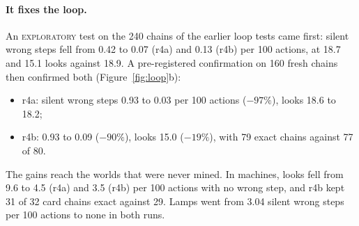 \documentclass[11pt]{article}
\newcommand{\explo}{\textsc{exploratory}}
\begin{document}
\begin{table}[t]\centering\small
\caption{Training on its own errors. Single questions: the trainer's readout on the 15,008 items (accuracy; confident
errors per 100 answers in T / H / U; Appendix~\ref{app:overlap} gives them without the questions that overlap the
training rows). Loop: the default rule on chains paired with V42, silent wrong steps
and looks per 100 actions. Guard: the pre-registered gate on the larger guard set (Table~\ref{tab:guard}).}
\label{tab:runs}
\end{table}

\paragraph{It fixes the loop.} An \explo{} test on the 240 chains of the earlier loop tests came first: silent wrong
steps fell from 0.42 to 0.07 (r4a) and 0.13 (r4b) per 100 actions, at 18.7 and 15.1 looks against 18.9. A
pre-registered confirmation on 160 fresh chains then confirmed both (Figure~\ref{fig:loop}b):
\begin{itemize}
  \item r4a: silent wrong steps 0.93 to 0.03 per 100 actions ($-97\%$), looks 18.6 to 18.2;
  \item r4b: 0.93 to 0.09 ($-90\%$), looks 15.0 ($-19\%$), with 79 exact chains against 77 of 80.
\end{itemize}
The gains reach the worlds that were never mined. In machines, looks fell from 9.6 to 4.5 (r4a) and 3.5 (r4b) per 100
actions with no wrong step, and r4b kept 31 of 32 card chains exact against 29. Lamps went from 3.04 silent wrong steps
per 100 actions to none in both runs.
\end{document}
